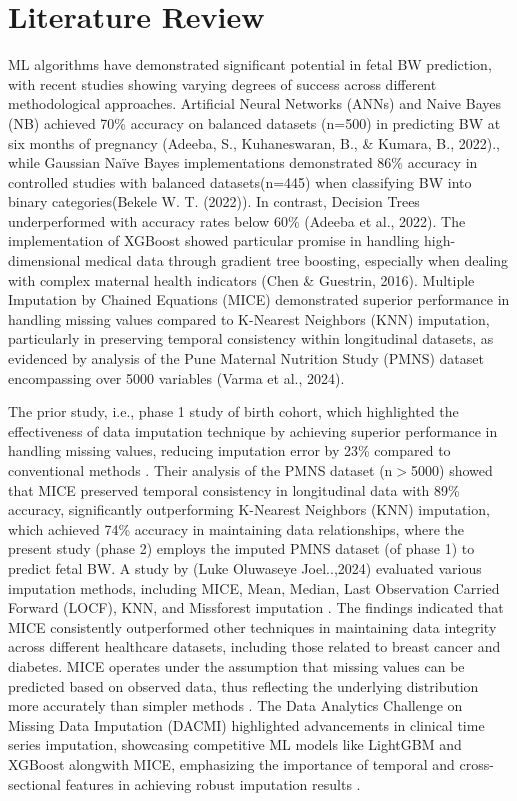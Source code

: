 \section{Literature Review}
ML algorithms have demonstrated significant potential in fetal BW prediction, with recent studies showing varying degrees of success across different methodological approaches. Artificial Neural Networks (ANNs) and Naive Bayes (NB) achieved 70\% accuracy on balanced datasets (n=500) in predicting BW at six months of pregnancy (Adeeba, S., Kuhaneswaran, B., \& Kumara, B., 2022).\cite{5A}, while Gaussian Naïve Bayes implementations demonstrated 86\% accuracy in controlled studies with balanced datasets(n=445) when classifying BW into binary categories(Bekele W. T. (2022))\cite{6A}. In contrast, Decision Trees underperformed with accuracy rates below 60\% (Adeeba et al., 2022)\cite{5A}. The implementation of XGBoost showed particular promise in handling high-dimensional medical data through gradient tree boosting, especially when dealing with complex maternal health indicators (Chen \& Guestrin, 2016)\cite{7A}. Multiple Imputation by Chained Equations (MICE) demonstrated superior performance in handling missing values compared to K-Nearest Neighbors (KNN) imputation, particularly in preserving temporal consistency within longitudinal datasets, as evidenced by analysis of the Pune Maternal Nutrition Study (PMNS) dataset encompassing over 5000 variables (Varma et al., 2024)\cite{8A}.
 
The prior study, i.e., phase 1 study of birth cohort, which highlighted the effectiveness of data imputation technique by achieving superior performance in handling missing values, reducing imputation error by 23\% compared to conventional methods \cite{8A}. Their analysis of the PMNS dataset (n$>$5000) showed that MICE preserved temporal consistency in longitudinal data with 89\% accuracy, significantly outperforming K-Nearest Neighbors (KNN) imputation, which achieved 74\% accuracy in maintaining data relationships, where the present study (phase 2) employs the imputed PMNS dataset (of phase 1) to predict fetal BW. A study by (Luke Oluwaseye Joel..,2024) evaluated various imputation methods, including MICE, Mean, Median, Last Observation Carried Forward (LOCF), KNN, and Missforest imputation \cite{9A}. The findings indicated that MICE consistently outperformed other techniques in maintaining data integrity across different healthcare datasets, including those related to breast cancer and diabetes.  MICE operates under the assumption that missing values can be predicted based on observed data, thus reflecting the underlying distribution more accurately than simpler methods \cite{9A}. The Data Analytics Challenge on Missing Data Imputation (DACMI) highlighted advancements in clinical time series imputation, showcasing competitive ML models like LightGBM and XGBoost alongwith MICE, emphasizing the importance of temporal and cross-sectional features in achieving robust imputation results \cite{10A}.

